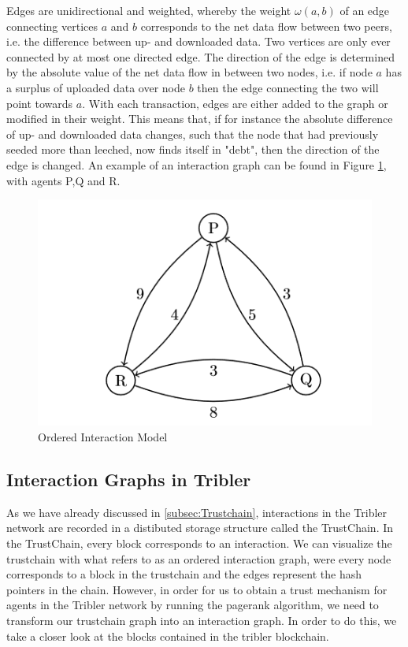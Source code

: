 \documentclass[twocolumn]{article}
\theoremstyle{definition}
\theoremstyle{theorem}
\begin{document}
\noindent Edges are unidirectional and weighted, whereby the weight $\omega(a,b)$ of an edge connecting vertices $a$ and $b$ corresponds to the net data flow between two peers, i.e. the difference between up- and downloaded data. Two vertices are only ever connected by at most one directed edge. The direction of the edge is determined by the absolute value of the net data flow in between two nodes, i.e. if node $a$ has a surplus of uploaded data over node $b$ then the edge connecting the two will point towards $a$. With each transaction, edges are either added to the graph or modified in their weight. This means that, if for instance the absolute difference of up- and downloaded data changes, such that the node that had previously seeded more than leeched, now finds itself in "debt", then the direction of the edge is changed. An example of an interaction graph can be found in Figure \ref{fig:InteractionGraph}, with agents P,Q and R.
\begin{figure}
\includegraphics[scale=1]{InteractionGraph}
\caption{Ordered Interaction Model}
\label{fig:InteractionGraph}
\end{figure}

\subsection{Interaction Graphs in Tribler}
\label{subsec:InteractionGraphsInTribler}
As we have already discussed in \ref{subsec:Trustchain}, interactions in the Tribler network are recorded in a distibuted storage structure called the TrustChain. In the TrustChain, every block corresponds to an interaction. We can visualize the trustchain with what \cite{Sybil-resistant trust mechanisms in distributed systems} refers to as an ordered interaction graph, were every node corresponds to a block in the trustchain and the edges represent the hash pointers in the chain. However, in order for us to obtain a trust mechanism for agents in the Tribler network by running the pagerank algorithm, we need to transform our trustchain graph into an interaction graph. In order to do this, we take a closer look at the blocks contained in the tribler blockchain. \vspace{1em}\\
\end{document}
